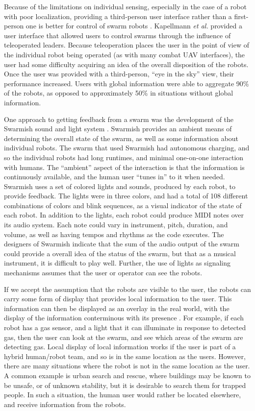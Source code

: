 Because of the limitations on individual sensing, especially in the case of a robot with poor localization, providing a third-person user interface rather than a first-person one is better for control of swarm robots \citep{kapellmann2016human}. 
Kapellmann \emph{et al.} provided a user interface that allowed users to control swarms through the influence of teleoperated leaders. 
Because teleoperation places the user in the point of view of the individual robot being operated (as with many combat UAV interfaces), the user had some difficulty acquiring an idea of the overall disposition of the robots. 
Once the user was provided with a third-person, ``eye in the sky'' view, their performance increased. 
Users with global information were able to aggregate 90\% of the robots, as opposed to approximately 50\% in situations without global information. 

One approach to getting feedback from a swarm was the development of the Swarmish sound and light system \citep{mclurkin2006speaking}. 
Swarmish provides an ambient means of determining the overall state of the swarm, as well as some information about individual robots. 
The swarm that used Swarmish had autonomous charging, and so the individual robots had long runtimes, and minimal one-on-one interaction with humans. 
The ``ambient'' aspect of the interaction is that the information is continuously available, and the human user ``tunes in'' to it when needed. 
Swarmish uses a set of colored lights and sounds, produced by each robot, to provide feedback. 
The lights were in three colors, and had a total of 108 different combinations of colors and blink sequences, as a visual indicator of the state of each robot. 
In addition to the lights, each robot could produce MIDI notes over its audio system. 
Each note could vary in instrument, pitch, duration, and volume, as well as having tempos and rhythms as the code executes. 
The designers of Swarmish indicate that the sum of the audio output of the swarm could provide a overall idea of the status of the swarm, but that as a musical instrument, it is difficult to play well. 
Further, the use of lights as signaling mechanisms assumes that the user or operator can see the robots. 

If we accept the assumption that the robots are visible to the user, the robots can carry some form of display that provides local information to the user. 
This information can then be displayed as an overlay in the real world, with the display of the information conterminous with its presence \citep{Daily:2003:WEI:820752.821587}. 
For example, if each robot has a gas sensor, and a light that it can illuminate in response to detected gas, then the user can look at the swarm, and see which areas of the swarm are detecting gas.
Local display of local information works if the user is part of a hybrid human/robot team, and so is in the same location as the users. 
However, there are many situations where the robot is not in the same location as the user. 
A common example is urban search and rescue, where buildings may be known to be unsafe, or of unknown stability, but it is desirable to search them for trapped people. 
In such a situation, the human user would rather be located elsewhere, and receive information from the robots. 

